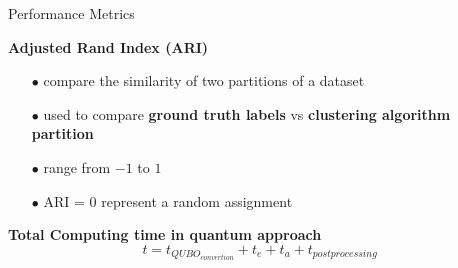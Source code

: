 		\begin{frame}{Performance Metrics}

									
			\textbf{Adjusted Rand Index (ARI)}
			\begin{itemize}
				\item[$\bullet$] compare the similarity of two partitions of a dataset 
				\item[$\bullet$] used to compare \textbf{ground truth labels} vs \textbf{clustering algorithm partition} 
				\item[$\bullet$] range from $-1$ to $1$ 
				\item[$\bullet$] ARI = 0 represent a random assignment
			\end{itemize}
			
			\textbf{Total Computing time in quantum approach}
			\begin{equation}
				t = t_{QUBO_{convertion}} + t_{e} + t_{a} + t_{postprocessing}
			\end{equation}

		
		\end{frame}

